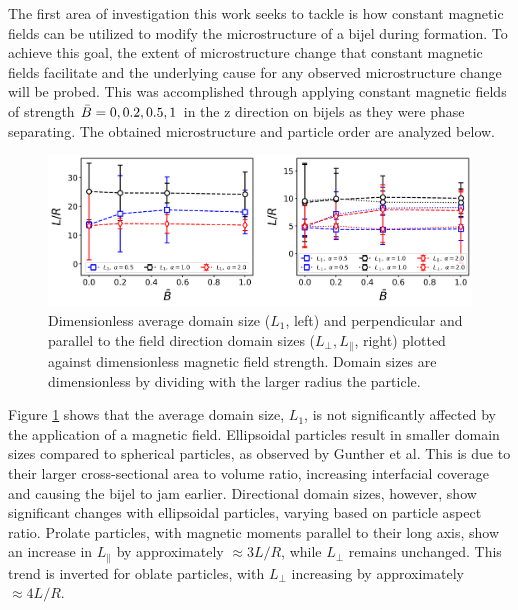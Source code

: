 The first area of investigation this work seeks to tackle is how constant magnetic fields can be utilized to modify the microstructure of a bijel during formation. To achieve this goal, the extent of microstructure change that constant magnetic fields facilitate and the underlying cause for any observed microstructure change will be probed. This was accomplished through applying constant magnetic fields of strength $\Bar{B} = 0, 0.2, 0.5, 1$ in the z direction on bijels as they were phase separating. The obtained microstructure and particle order are analyzed below.

\begin{figure}[h]
    \centering
    \includegraphics[scale = 0.5]{figures/results/paper1/D2a-vs-B_ss.png}
    \caption{Dimensionless average domain size ($L_1$, left) and perpendicular and parallel to the field direction domain sizes ($L_{\perp}, L_{\parallel}$, right) plotted against dimensionless magnetic field strength. Domain sizes are dimensionless by dividing with the larger radius the particle.}
    \label{fig:P1_D-vs-B-ss}
\end{figure}

Figure \ref{fig:P1_D-vs-B-ss} shows that the average domain size, $L_1$, is not significantly affected by the application of a magnetic field. Ellipsoidal particles result in smaller domain sizes compared to spherical particles, as observed by Gunther et al. This is due to their larger cross-sectional area to volume ratio, increasing interfacial coverage and causing the bijel to jam earlier. Directional domain sizes, however, show significant changes with ellipsoidal particles, varying based on particle aspect ratio. Prolate particles, with magnetic moments parallel to their long axis, show an increase in $L_{\parallel}$ by approximately $\approx 3 L/R$, while $L_{\perp}$ remains unchanged. This trend is inverted for oblate particles, with $L_{\perp}$ increasing by approximately $\approx 4 L/R$.

